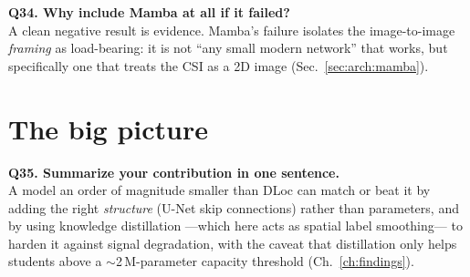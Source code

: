 \textbf{Q34. Why include Mamba at all if it failed?}\\
A clean negative result is evidence. Mamba's failure isolates the image-to-image \emph{framing} as
load-bearing: it is not ``any small modern network'' that works, but specifically one that treats the
CSI as a 2D image (Sec.~\ref{sec:arch:mamba}).

\section{The big picture}
\label{sec:qa:big}

\textbf{Q35. Summarize your contribution in one sentence.}\\
A model an order of magnitude smaller than DLoc can match or beat it by adding the right
\emph{structure} (U-Net skip connections) rather than parameters, and by using knowledge distillation
---which here acts as spatial label smoothing--- to harden it against signal degradation, with the
caveat that distillation only helps students above a $\sim$2\,M-parameter capacity threshold
(Ch.~\ref{ch:findings}).
